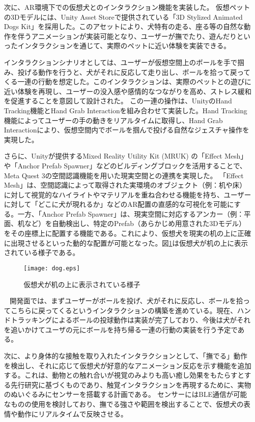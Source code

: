 \documentclass[a4j]{ltjsarticle}
\newcounter{seccnt}
\newcommand{\usection}[1]{\ \newline{\bf\underline{\theseccnt\stepcounter{seccnt}. #1}\hspace{10pt}}}
\begin{document}
次に、AR環境下での仮想犬とのインタラクション機能を実装した。
仮想ペットの3Dモデルには、Unity Asset Storeで提供されている「3D Stylized Animated Dogs Kit」を採用した。このアセットにより、犬特有の走る、座る等の自然な動作を伴うアニメーションが実装可能となり、ユーザーが撫でたり、遊んだりといったインタラクションを通じて、実際のペットに近い体験を実装できる。

インタラクションシナリオとしては、ユーザーが仮想空間上のボールを手で掴み、投げる動作を行うと、犬がそれに反応して走り出し、ボールを拾って戻ってくる一連の行動を想定した。このインタラクションは、実際のペットとの遊びに近い体験を再現し、ユーザーの没入感や感情的なつながりを高め、ストレス緩和を促進することを意図して設計された。
この一連の操作は、UnityのHand Tracking機能とHand Grab Interactionを組み合わせて実装した。Hand Tracking機能によってユーザーの手の動きをリアルタイムに取得し、Hand Grab Interactionにより、仮想空間内でボールを掴んで投げる自然なジェスチャ操作を実現した。

さらに、Unityが提供するMixed Reality Utility Kit (MRUK) の「Effect Mesh」や「Anchor Prefab Spawner」などのビルディングブロックを活用することで、Meta Quest 3の空間認識機能を用いた現実空間との連携を実現した。
「Effect Mesh」は、空間認識によって取得された実環境のオブジェクト（例：机や床）に対して視覚的なハイライトやマテリアルを重ね合わせる機能を持ち、ユーザーに対して「どこに犬が現れるか」などのAR配置の直感的な可視化を可能にする。一方、「Anchor Prefab Spawner」は、現実空間に対応するアンカー（例：平面、机など）を自動検出し、特定のPrefab（あらかじめ用意された3Dモデル）をその座標上に配置する機能である。これにより、仮想犬を現実の机の上に正確に出現させるといった動的な配置が可能となった。図\ref{fig:dog}は仮想犬が机の上に表示されている様子である。

\begin{figure}[b]
  \centering
  \texttt{[image: dog.eps]}
  \caption{仮想犬が机の上に表示されている様子}
  \label{fig:dog}
\end{figure}


\usection{今後の計画}
開発面では、まずユーザーがボールを投げ、犬がそれに反応し、ボールを拾ってこちらに戻ってくるというインタラクションの構築を進めている。現在、ハンドトラッキングによるボールの投球動作は実装が完了しており、今後は犬がそれを追いかけてユーザの元にボールを持ち帰る一連の行動の実装を行う予定である。

次に、より身体的な接触を取り入れたインタラクションとして、「撫でる」動作を検出し、それに応じて仮想犬が好意的なアニメーション反応を示す機能を追加する。これは、動物との触れ合いが視覚のみよりも高い癒し効果をもたらすとする先行研究\cite{3}に基づくものであり、触覚インタラクションを再現するために、実物のぬいぐるみにセンサーを搭載する計画である。
センサーにはBLE通信が可能なものの使用を検討しており、撫でる強さや範囲を検出することで、仮想犬の表情や動作にリアルタイムで反映させる。
\end{document}
